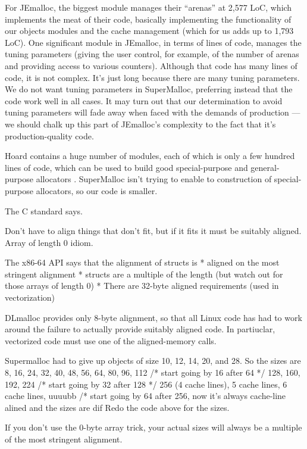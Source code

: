 \documentclass{sigplanconf}
\begin{document}
For JEmalloc, the biggest module manages their ``arenas'' at 2,577
LoC, which implements the meat of their code, basically implementing
the functionality of our objects modules and the cache management
(which for us adds up to 1,793 LoC).  One significant module in
JEmalloc, in terms of lines of code, manages the tuning parameters
(giving the user control, for example, of the number of arenas and
providing access to various counters).  Although that code has many
lines of code, it is not complex.  It's just long because there are
many tuning parameters.  We do not want tuning parameters in
SuperMalloc, preferring instead that the code work well in all cases.
It may turn out that our determination to avoid tuning parameters will
fade away when faced with the demands of production --- we should
chalk up this part of JEmalloc's complexity to the fact that it's
production-quality code.

Hoard contains a huge number of modules, each of which is only a few
hundred lines of code, which can be used to build good special-purpose
and general-purpose allocators \cite{AlexandrescuBe05}.  SuperMalloc
isn't trying to enable to construction of special-purpose allocators,
so our code is smaller.


The C standard says.

Don't have to align things that don't fit, but if it fits it must be suitably aligned.
 Array of length 0 idiom.

The x86-64 API says that the alignment of structs is
 * aligned on the most stringent alignment
 * structs are a multiple of the length (but watch out for those arrays of length 0)
 * There are 32-byte aligned requirements (used in vectorization)

DLmalloc provides only 8-byte alignment, so that all Linux code has had to work around the failure to actually provide suitably aligned code.  In partiuclar, vectorized code must use one of the aligned-memory calls.

Supermalloc had to give up objects of size 10, 12, 14, 20, and 28.  So the sizes are
 8, 16, 24, 32, 40, 48, 56, 64,
 80, 96, 112 /* start going by 16 after 64 */ 
 128, 160,  192, 224 /* start going by 32 after 128 */
 256 (4 cache lines), 5 cache lines, 6 cache lines, uuuubb  /* start going by 64 after 256, now it's always cache-line alined and the sizes are dif
Redo the code above for the sizes.

If you don't use the 0-byte array trick, your actual sizes will always be a multiple of the most stringent alignment.
\end{document}
